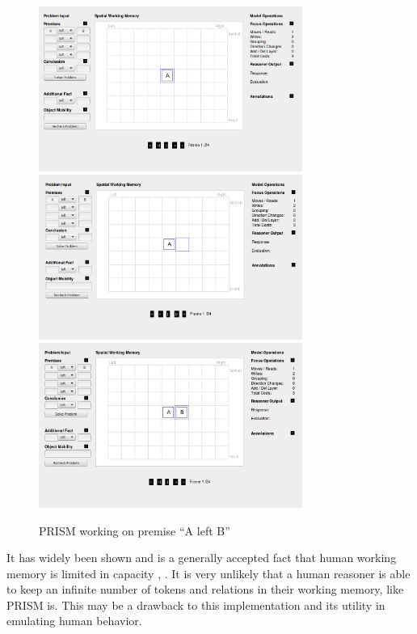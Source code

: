 \documentclass[hidelinks]{scrartcl}
\begin{document}
\begin{figure}[H]
	\caption{PRISM working on \gls{premise} ``A left B''}
	\label{img:PRISM}
	\centering
	\includegraphics[width=0.77\textwidth]{Illustrations/PRISM1.png}
	\includegraphics[width=0.77\textwidth]{Illustrations/PRISM2.png}
	\includegraphics[width=0.77\textwidth]{Illustrations/PRISM3.png}
\end{figure}

It has widely been shown and is a generally accepted fact that human \gls{working memory} is limited in capacity \citep{Baddeley.2007}, \citep{Miller.1956}. It is very unlikely that a human reasoner is able to keep an infinite number of \gls{token}s and relations in their working memory, like PRISM is. This may be a drawback to this implementation and its utility in emulating human behavior. \\
\end{document}
